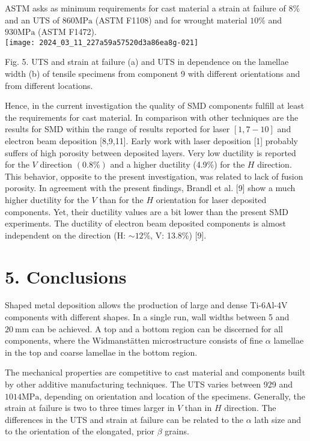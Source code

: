 \documentclass[10pt]{article}
\begin{document}
ASTM asks as minimum requirements for cast material a strain at failure of $8 \%$ and an UTS of $860 \mathrm{MPa}$ (ASTM F1108) and for wrought material $10 \%$ and $930 \mathrm{MPa}$ (ASTM F1472).\\
\texttt{[image: 2024\_03\_11\_227a59a57520d3a86ea8g-021]}

Fig. 5. UTS and strain at failure (a) and UTS in dependence on the lamellae width (b) of tensile specimens from component 9 with different orientations and from different locations.

Hence, in the current investigation the quality of SMD components fulfill at least the requirements for cast material. In comparison with other techniques are the results for SMD within the range of results reported for laser $[1,7-10]$ and electron beam deposition [8,9,11]. Early work with laser deposition [1] probably suffers of high porosity between deposited layers. Very low ductility is reported for the $V$ direction $(0.8 \%)$ and a higher ductility (4.9\%) for the $H$ direction. This behavior, opposite to the present investigation, was related to lack of fusion porosity. In agreement with the present findings, Brandl et al. [9] show a much higher ductility for the $V$ than for the $H$ orientation for laser deposited components. Yet, their ductility values are a bit lower than the present SMD experiments. The ductility of electron beam deposited components is almost independent on the direction (H: $\sim 12 \%$, V: 13.8\%) [9].

\section*{5. Conclusions}
Shaped metal deposition allows the production of large and dense Ti-6Al-4V components with different shapes. In a single run, wall widths between 5 and $20 \mathrm{~mm}$ can be achieved. A top and a bottom region can be discerned for all components, where the Widmanstätten microstructure consists of fine $\alpha$ lamellae in the top and coarse lamellae in the bottom region.

The mechanical properties are competitive to cast material and components built by other additive manufacturing techniques. The UTS varies between 929 and $1014 \mathrm{MPa}$, depending on orientation and location of the specimens. Generally, the strain at failure is two to three times larger in $V$ than in $H$ direction. The differences in the UTS and strain at failure can be related to the $\alpha$ lath size and to the orientation of the elongated, prior $\beta$ grains.
\end{document}
